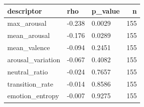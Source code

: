 \begin{tabular}{lllr}
\toprule
descriptor & rho & p\_value & n \\
\midrule
max\_arousal & -0.238 & 0.0029 & 155 \\
mean\_arousal & -0.176 & 0.0289 & 155 \\
mean\_valence & -0.094 & 0.2451 & 155 \\
arousal\_variation & -0.067 & 0.4082 & 155 \\
neutral\_ratio & -0.024 & 0.7657 & 155 \\
transition\_rate & -0.014 & 0.8586 & 155 \\
emotion\_entropy & -0.007 & 0.9275 & 155 \\
\bottomrule
\end{tabular}
